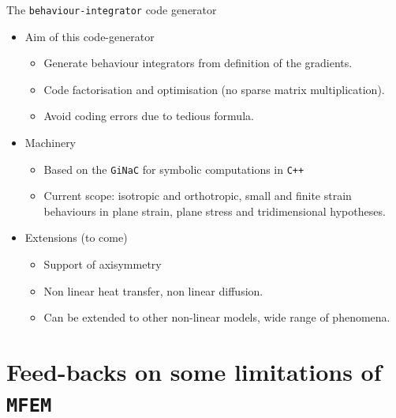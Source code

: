 \documentclass{beamer}
\begin{document}
\begin{frame}[fragile]{The
    \texttt{behaviour-integrator} code
    generator}
  \begin{itemize}
    \item Aim of this code-generator
    \begin{itemize}
      \item Generate behaviour integrators from definition of the gradients.
      \item Code factorisation and optimisation (no sparse matrix multiplication).
      \item Avoid coding errors due to tedious formula.
    \end{itemize}
    \item Machinery
    \begin{itemize}
      \item Based on the \texttt{GiNaC} for symbolic
      computations in \texttt{C++}
      \item Current scope: isotropic and orthotropic, small
      and finite strain behaviours in plane strain, plane stress and
      tridimensional hypotheses.
    \end{itemize}
    \item Extensions (to come)
    \begin{itemize}
      \item Support of axisymmetry
      \item Non linear heat transfer, non linear diffusion.
      \item Can be extended to other non-linear models, wide
      range of phenomena.
    \end{itemize}
  \end{itemize}
\end{frame}

\section{Feed-backs on some limitations of {\tt MFEM}}
\end{document}
